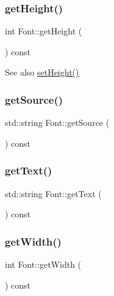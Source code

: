 \subsubsection{\texorpdfstring{get\+Height()}{getHeight()}}
{\footnotesize\ttfamily int Font\+::get\+Height (\begin{DoxyParamCaption}{ }\end{DoxyParamCaption}) const}

\begin{DoxySeeAlso}{See also}
\mbox{\hyperlink{class_font_adc672745b542873f41cd3e13c3b05da3}{set\+Height()}} 
\end{DoxySeeAlso}
\mbox{\label{class_font_ac6bc1fec3b5df15f0c3e7fcc390921c3}} 
\subsubsection{\texorpdfstring{get\+Source()}{getSource()}}
{\footnotesize\ttfamily std\+::string Font\+::get\+Source (\begin{DoxyParamCaption}{ }\end{DoxyParamCaption}) const}

\mbox{\label{class_font_aa98667de37350ff56f3555eef663792c}} 
\subsubsection{\texorpdfstring{get\+Text()}{getText()}}
{\footnotesize\ttfamily std\+::string Font\+::get\+Text (\begin{DoxyParamCaption}{ }\end{DoxyParamCaption}) const}

\mbox{\label{class_font_a9466673d1576043dc7fa7d0bfcc505e0}} 
\subsubsection{\texorpdfstring{get\+Width()}{getWidth()}}
{\footnotesize\ttfamily int Font\+::get\+Width (\begin{DoxyParamCaption}{ }\end{DoxyParamCaption}) const}

